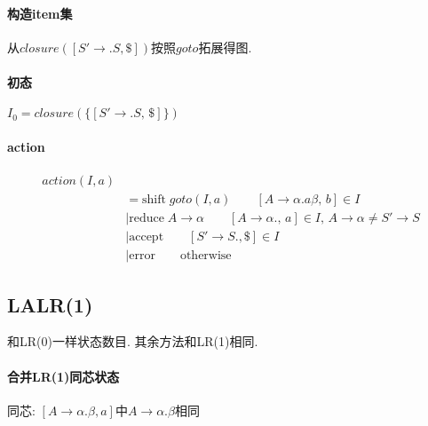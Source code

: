 \documentclass{ctexart}
\begin{document}
\paragraph{构造item集} 从$closure([S' \to .S, \$])$按照$goto$拓展得图.
\paragraph{初态} $I_0 = closure(\{[S' \to .S,\, \$]\})$
\paragraph{action} \begin{align*}
    action(I, a)&\\
        &= \text{shift}\; goto(I, a)    \qquad [A \to \alpha .a \beta,\, b] \in I\\
        &| \text{reduce}\; A\to\alpha    \qquad [A \to \alpha.,\, a] \in I,\, A\to\alpha \neq S'\to S\\
        &| \text{accept}                \qquad [S' \to S., \$] \in I\\
        &| \text{error}                 \qquad \text{otherwise}
    \end{align*}

\subsection{LALR(1)}
    和LR(0)一样状态数目.
    其余方法和LR(1)相同.
\paragraph{合并LR(1)同芯状态} 同芯: $[A\to\alpha.\beta, a]$中$A\to\alpha.\beta$相同


\end{document}
